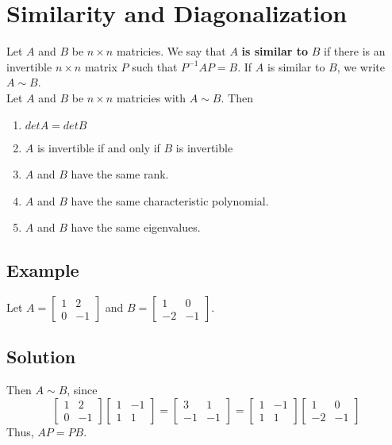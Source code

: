 \section{Similarity and Diagonalization}
Let $A$ and $B$ be $n\times n$ matricies. We say that $A$ \textbf{is similar to} $B$ if there is an invertible $n\times n$ matrix $P$ such that $P^{-1}AP = B$. If $A$ is similar to $B$, we write $A\sim B$.\\

Let $A$ and $B$ be $n\times n$ matricies with $A\sim B$. Then
\begin{enumerate}[a]
    \item $det A = det B$
    \item $A$ is invertible if and only if $B$ is invertible
    \item $A$ and $B$ have the same rank.
    \item $A$ and $B$ have the same characteristic polynomial.
    \item $A$ and $B$ have the same eigenvalues.
\end{enumerate}
\subsection*{Example}
Let $A = \begin{bmatrix}
    1&2\\0&-1
\end{bmatrix}$ and $B = \begin{bmatrix}
    1&0\\-2&-1
\end{bmatrix}.$ 
\subsection*{Solution}
Then $A\sim B$, since 
$$\begin{bmatrix}
    1&2\\0&-1
\end{bmatrix}\begin{bmatrix}
    1&-1\\1&1
\end{bmatrix} = \begin{bmatrix}
    3&1\\-1&-1
\end{bmatrix} = \begin{bmatrix}
    1&-1\\1&1
\end{bmatrix}\begin{bmatrix}
    1&0\\-2&-1
\end{bmatrix}$$ Thus, $AP = PB$. 

